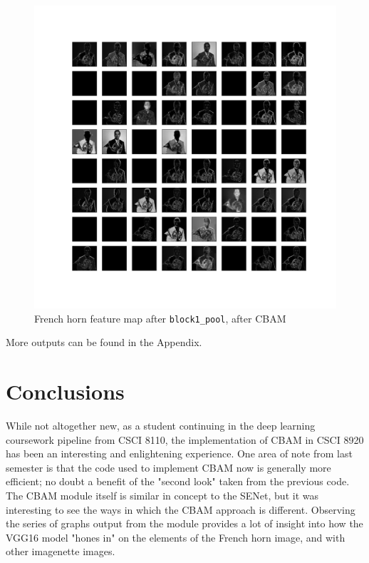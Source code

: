 \documentclass{article}
\begin{document}
\begin{figure}[H]
    \centering
    \includegraphics[width=6in]{csci-8920/hw-4/images/horn-post-CBAM-3-block1_pool.png}
    \caption{French horn feature map after \lstinline{block1_pool}, after CBAM}
    \label{fig:horn_1_post}
\end{figure}

More outputs can be found in the  Appendix.

\section{Conclusions}
While not altogether new, as a student continuing in the deep learning coursework pipeline from CSCI 8110, the implementation of CBAM in CSCI 8920 has been an interesting and enlightening experience.
One area of note from last semester is that the code used to implement CBAM now is generally more efficient; no doubt a benefit of the "second look" taken from the previous code.
The CBAM module itself is similar in concept to the SENet, but it was interesting to see the ways in which the CBAM approach is different.
Observing the series of graphs output from the module provides a lot of insight into how the VGG16 model "hones in" on the elements of the French horn image, and with other imagenette images.
\end{document}
